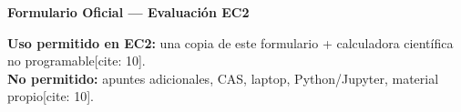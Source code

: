 \documentclass[10pt, a4paper]{article}
\begin{document}
\begin{center}
    \Large\textbf{\textcolor{ucbblue}{Formulario Oficial — Evaluación EC2}}\\[0.2cm]
\end{center}

\begin{tcolorbox}[colback=yellow!10, colframe=black, title=\textbf{Reglas de Uso durante la Evaluación}, left=2mm, right=2mm, top=1mm, bottom=1mm]
    \small
    \textbf{Uso permitido en EC2:} una copia de este formulario + calculadora científica no programable[cite: 10]. \\
    \textbf{No permitido:} apuntes adicionales, CAS, laptop, Python/Jupyter, material propio[cite: 10].
\end{tcolorbox}

\vspace{0.2cm}
\end{document}
